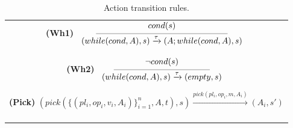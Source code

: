 \begin{table}[!h]
{{\begin{tabular}{c}
\hspace{2.1cm}\textbf{(Wh1)}\hspace{-0.2cm}
$\reglaa{ %
cond(s)
}
{ %
(while(cond,A),s)
\xrightarrow{\tau}
(A ; while(cond,A),s)
}{5.5}$

\\[0.3cm]

\hspace{0.1cm}\textbf{(Wh2)}\hspace{-0.2cm}
$\reglaa{ %
\neg cond(s)
}
{ %
(while(cond,A),s)
\xrightarrow{\tau}
(empty,s)
}{4}$

\hspace{-0.1cm}\textbf{(Pick)}\hspace{-0.0cm}
$(pick(\{(pl_i,op_i,v_i,A_i)\}_{i=1}^n ,A,t),s)
\xrightarrow{pick(pl_i,op_i,m,A_i)}
(A_i,s')$

\\[-0.2cm]
\hspace{5.8cm}{\tiny $\textrm{where}\ {\it t \geq 1, v_i \in VAR, m \in \entero, pl_i \in PL,}\ \textrm{and} \ {\it s'=(\sigma[m/v_i],\rho), \forall i \in \{1..n\}}.$}
\\[0.2cm]

\end{tabular}
}
}

\vspace{-0.3cm}
\caption{\label{tran1}Action transition rules.}
\end{table}



